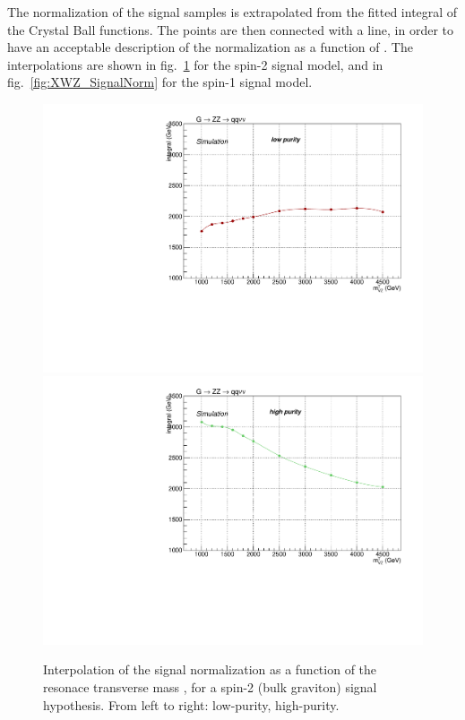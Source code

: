 \noindent The normalization of the signal samples is extrapolated from the fitted integral of the Crystal Ball functions. The points are then connected with a line, in order to have an acceptable description of the normalization as a function of \mtVZ. The interpolations are shown in fig.~\ref{fig:XZZ_SignalNorm} for the spin-2 signal model, and in fig.~\ref{fig:XWZ_SignalNorm} for the spin-1 signal model.%

\begin{figure}[!htb]
  \centering
    \includegraphics[width=.495\textwidth]{plotsAlpha_tesi/XVZnnlp/XZZInv_SignalNorm.pdf}
    \includegraphics[width=.495\textwidth]{plotsAlpha_tesi/XVZnnhp/XZZInv_SignalNorm.pdf}
  \caption{Interpolation of the signal normalization as a function of the resonace transverse mass \mtVZ, for a spin-2 (bulk graviton) signal hypothesis. From left to right: low-purity, high-purity.}
  \label{fig:XZZ_SignalNorm}
\end{figure}

